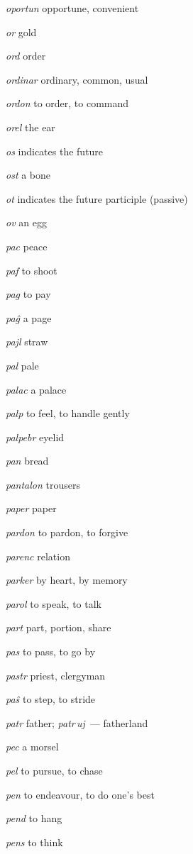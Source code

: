 \begin{landscape}
\begin{multicols}{5}
\begin{outdent}{1em}
\emph{oportun}  opportune, convenient

\emph{or}  gold

\emph{ord}  order

\emph{ordinar}  ordinary, common, usual

\emph{ordon} to order, to command

\emph{orel} the ear

\emph{os} indicates the future

\emph{ost}  a bone

\emph{ot}  indicates the future participle (passive)

\emph{ov}  an egg
\end{outdent}


\begin{outdent}{1em}
\emph{pac}  peace

\emph{paf}  to shoot

\emph{pag} to pay

\emph{paĝ}  a page

\emph{pajl}  straw

\emph{pal} pale

\emph{palac}  a palace

\emph{palp} to feel, to handle gently

\emph{palpebr}  eyelid

\emph{pan}  bread

\emph{pantalon}  trousers

\emph{paper}  paper

\emph{pardon}  to pardon, to forgive

\emph{parenc}  relation

\emph{parker}  by heart, by memory

\emph{parol}  to speak, to talk

\emph{part}  part, portion, share

\emph{pas}  to pass, to go by

\emph{pastr}  priest, clergyman

\emph{paŝ}  to step, to stride

\emph{patr}  father; \emph{patr\,uj\,} — fatherland

\emph{pec}  a morsel

\emph{pel}  to pursue, to chase

\emph{pen}  to endeavour, to do one’s best

\emph{pend}  to hang

\emph{pens}  to think


\end{outdent}
\end{multicols}
\end{landscape}
